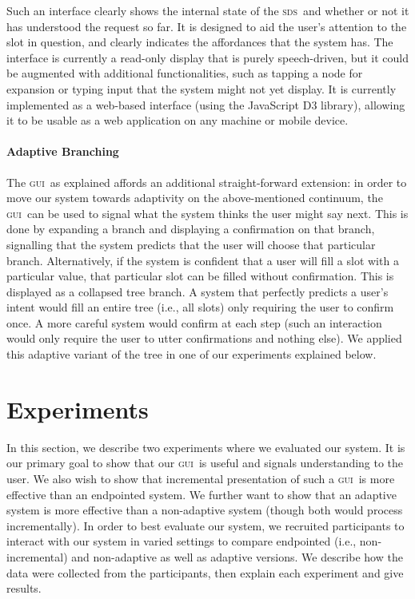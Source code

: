 \documentclass[11pt]{article}
\newcommand{\sds}[0]{\textsc{sds}}
\newcommand{\ui}[0]{\textsc{gui}}
\begin{document}
Such an interface clearly shows the internal state of the \sds\ and whether or not it has understood the request so far. It is designed to aid the user's attention to the slot in question, and clearly indicates the affordances that the system has. The interface is currently a read-only display that is purely speech-driven, but it could be augmented with additional functionalities, such as tapping a node for expansion or typing input that the system might not yet display. It is currently implemented as a web-based interface (using the JavaScript D3 library), allowing it to be usable as a web application on any machine or mobile device. 

\paragraph{Adaptive Branching} The \ui\ as explained affords an additional straight-forward extension: in order to move our system towards adaptivity on the above-mentioned continuum, the \ui\ can be used to signal what the system thinks the user might say next. This is done by expanding a branch and displaying a confirmation on that branch, signalling that the system predicts that the user will choose that particular branch. Alternatively, if the system is confident that a user will fill a slot with a particular value, that particular slot can be filled without confirmation. This is displayed as a collapsed tree branch. A system that perfectly predicts a user's intent would fill an entire tree (i.e., all slots) only requiring the user to confirm once. A more careful system would confirm at each step (such an interaction would only require the user to utter confirmations and nothing else). We applied this adaptive variant of the tree in one of our experiments explained below. 


\section{Experiments}
\label{section:experiments}

In this section, we describe two experiments where we evaluated our system. It is our primary goal to show that our \ui\ is useful and signals understanding to the user. We also wish to show that incremental presentation of such a \ui\ is more effective than an endpointed system. We further want to show that an adaptive system is more effective than a non-adaptive system (though both would process incrementally). In order to best evaluate our system, we recruited participants to interact with our system in varied settings to compare endpointed (i.e., non-incremental) and non-adaptive as well as adaptive versions. We describe how the data were collected from the participants, then explain each experiment and give results.
\end{document}
